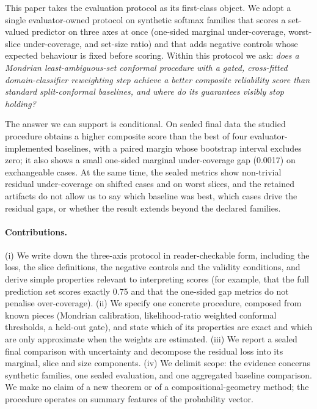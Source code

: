 \documentclass{article}
\begin{document}
This paper takes the evaluation protocol as its first-class object. We adopt a single evaluator-owned protocol on synthetic softmax families that scores a set-valued predictor on three axes at once (one-sided marginal under-coverage, worst-slice under-coverage, and set-size ratio) and that adds negative controls whose expected behaviour is fixed before scoring. Within this protocol we ask:
\emph{does a Mondrian least-ambiguous-set conformal procedure with a gated, cross-fitted domain-classifier reweighting step achieve a better composite reliability score than standard split-conformal baselines, and where do its guarantees visibly stop holding?}

The answer we can support is conditional. On sealed final data the studied procedure obtains a higher composite score than the best of four evaluator-implemented baselines, with a paired margin whose bootstrap interval excludes zero; it also shows a small one-sided marginal under-coverage gap (0.0017) on exchangeable cases. At the same time, the sealed metrics show non-trivial residual under-coverage on shifted cases and on worst slices, and the retained artifacts do not allow us to say which baseline was best, which cases drive the residual gaps, or whether the result extends beyond the declared families.

\paragraph{Contributions.}
(i) We write down the three-axis protocol in reader-checkable form, including the loss, the slice definitions, the negative controls and the validity conditions, and derive simple properties relevant to interpreting scores (for example, that the full prediction set scores exactly 0.75 and that the one-sided gap metrics do not penalise over-coverage).
(ii) We specify one concrete procedure, composed from known pieces (Mondrian calibration, likelihood-ratio weighted conformal thresholds, a held-out gate), and state which of its properties are exact and which are only approximate when the weights are estimated.
(iii) We report a sealed final comparison with uncertainty and decompose the residual loss into its marginal, slice and size components.
(iv) We delimit scope: the evidence concerns synthetic families, one sealed evaluation, and one aggregated baseline comparison. We make no claim of a new theorem or of a compositional-geometry method; the procedure operates on summary features of the probability vector.
\end{document}
